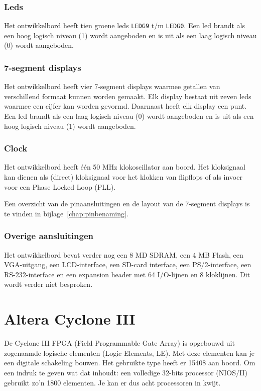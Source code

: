 \documentclass[a4paper,12pt,fleqn,twoside]{book}
\newcommand{\naam}[1]{\texttt{#1}}
\begin{document}
\subsubsection{Leds}
Het ontwikkelbord heeft tien groene leds \naam{LEDG9} t/m \naam{LEDG0}. Een
led brandt als een hoog logisch niveau (1) wordt aangeboden en is uit als een
laag logisch niveau (0) wordt aangeboden.

\subsubsection{7-segment displays}
Het ontwikkelbord heeft vier 7-segment displays waarmee getallen van
verschillend formaat kunnen worden gemaakt. Elk display bestaat uit zeven leds
waarmee een cijfer kan worden gevormd. Daarnaast heeft elk display een punt.
Een led brandt als een laag logisch niveau (0) wordt aangeboden en is uit als
een hoog logisch niveau (1) wordt aangeboden.

\subsubsection{Clock}
Het ontwikkelbord heeft \'{e}\'{e}n 50 MHz klokoscillator aan boord. Het
kloksignaal kan dienen als (direct) kloksignaal voor het klokken van flipflops
of als invoer voor een Phase Locked Loop (PLL).

Een overzicht van de pinaansluitingen en de layout van de 7-segment displays
is te vinden in bijlage~\ref{chap:pinbenaming}.

\subsubsection{Overige aansluitingen}
Het ontwikkelbord bevat verder nog een 8 MD SDRAM, een 4 MB Flash, een
VGA-uitgang, een LCD-interface, een SD-card interface, een PS/2-interface, een
RS-232-interface en een expansion header met 64 I/O-lijnen en 8 kloklijnen. Dit
wordt verder niet besproken.


\section{Altera Cyclone III}
\label{sec:alteracycloneiii}
De Cyclone III FPGA (Field Programmable Gate Array) is opgebouwd uit zogenaamde logische elementen (Logic
Elements, LE). Met deze elementen kan je een digitale schakeling bouwen. Het 
gebruikte type heeft er 15408 aan boord. Om een indruk te geven wat dat
inhoudt: een volledige 32-bits processor (NIOS/II) gebruikt zo'n 1800
elementen. Je kan er dus acht processoren in kwijt.
\end{document}
